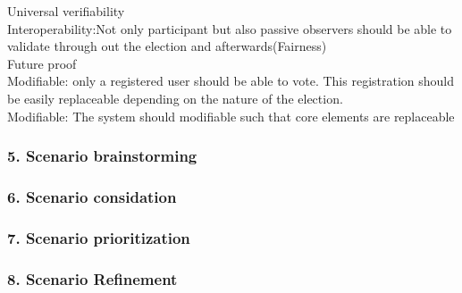 \noindent
Universal verifiability\\
Interoperability:Not only participant but also passive observers should be able to validate through out the election and afterwards(Fairness)\\


\noindent
Future proof\\
Modifiable: only a registered user should be able to vote. This registration should be easily replaceable depending on the nature of the election.\\
Modifiable: The system should modifiable such that core elements are replaceable\\








\subsubsection{5. Scenario brainstorming}

\subsubsection{6. Scenario considation}

\subsubsection{7. Scenario prioritization}

\subsubsection{8. Scenario Refinement}
        